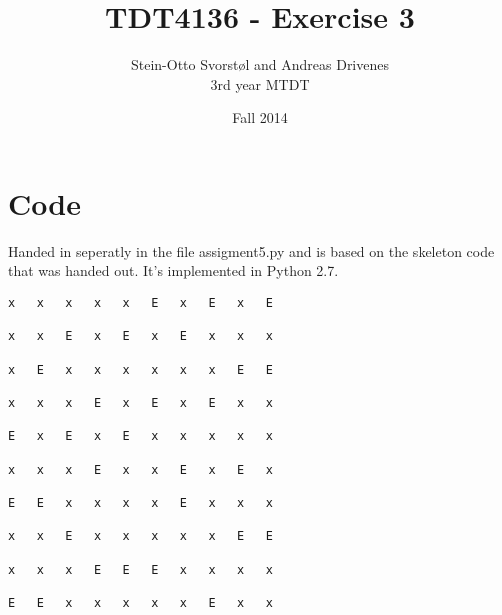\documentclass[11pt,a4paper]{article}
\author{Stein-Otto Svorstøl and Andreas Drivenes
\\3rd year MTDT}
\title{TDT4136 - Exercise 3}
\date{Fall 2014}
\begin{document}
\maketitle
\section{Code}
Handed in seperatly in the file assigment5.py and is based on the skeleton code that was handed out. It's implemented in Python 2.7.

\begin{lstlisting}
x   x   x   x   x   E   x   E   x   E

x   x   E   x   E   x   E   x   x   x

x   E   x   x   x   x   x   x   E   E

x   x   x   E   x   E   x   E   x   x

E   x   E   x   E   x   x   x   x   x

x   x   x   E   x   x   E   x   E   x

E   E   x   x   x   x   E   x   x   x

x   x   E   x   x   x   x   x   E   E

x   x   x   E   E   E   x   x   x   x

E   E   x   x   x   x   x   E   x   x
\end{lstlisting}
\end{document}
